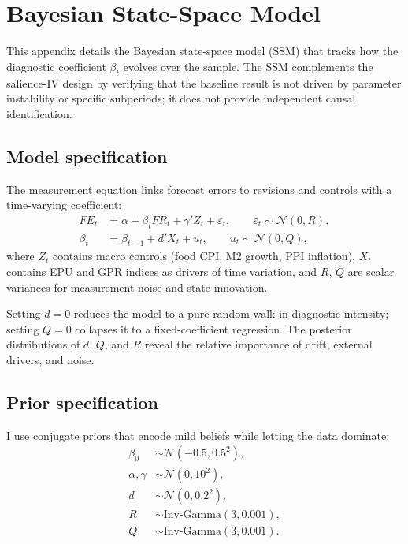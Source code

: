 \section{Bayesian State-Space Model}\label{app:ssm}

This appendix details the Bayesian state-space model (SSM)
that tracks how the diagnostic coefficient $\beta_t$
evolves over the sample. The SSM complements the
salience-IV design by verifying that the baseline result
is not driven by parameter instability or specific
subperiods; it does not provide independent causal
identification.

\subsection{Model specification}

The measurement equation links forecast errors to
revisions and controls with a time-varying coefficient:
\begin{align}
  FE_t &= \alpha + \beta_t FR_t + \gamma' Z_t
    + \varepsilon_t, \qquad
    \varepsilon_t \sim \mathcal{N}(0, R),
    \label{eq:ssm_measurement} \\
  \beta_t &= \beta_{t-1} + d' X_t + u_t, \qquad
    u_t \sim \mathcal{N}(0, Q),
    \label{eq:ssm_state}
\end{align}
where $Z_t$ contains macro controls (food CPI, M2 growth,
PPI inflation), $X_t$ contains EPU and GPR indices as
drivers of time variation, and $R$, $Q$ are scalar
variances for measurement noise and state innovation.

Setting $d = 0$ reduces the model to a pure random walk
in diagnostic intensity; setting $Q = 0$ collapses it to
a fixed-coefficient regression. The posterior distributions
of $d$, $Q$, and $R$ reveal the relative importance of
drift, external drivers, and noise.

\subsection{Prior specification}

I use conjugate priors that encode mild beliefs while
letting the data dominate:
\begin{align*}
  \beta_0 &\sim \mathcal{N}(-0.5, 0.5^2), \\
  \alpha, \gamma &\sim \mathcal{N}(0, 10^2), \\
  d &\sim \mathcal{N}(0, 0.2^2), \\
  R &\sim \text{Inv-Gamma}(3, 0.001), \\
  Q &\sim \text{Inv-Gamma}(3, 0.001).
\end{align*}

